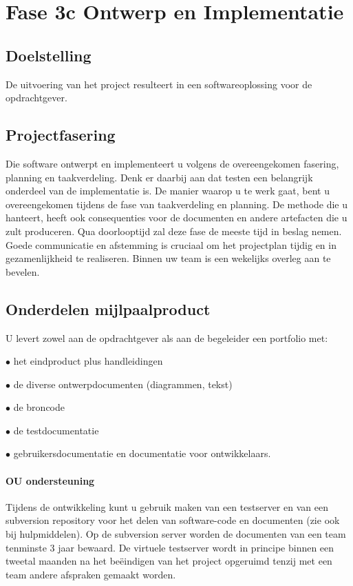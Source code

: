 \section{Fase 3c Ontwerp en Implementatie}
\subsection{Doelstelling}
De uitvoering van het project resulteert in een softwareoplossing
voor de opdrachtgever.

\subsection{Projectfasering}Die software ontwerpt en implementeert u volgens de
overeengekomen fasering, planning en taakverdeling. Denk er daarbij aan dat
testen een belangrijk onderdeel van de implementatie is. De manier waarop u
te werk gaat, bent u overeengekomen tijdens de fase van
taakverdeling en planning. De methode die u hanteert, heeft ook consequenties
voor de documenten en andere artefacten die u zult produceren. Qua doorlooptijd
zal deze fase de meeste tijd in beslag nemen. Goede
communicatie en afstemming is cruciaal om het projectplan tijdig en in
gezamenlijkheid te realiseren. Binnen uw team is een wekelijks overleg aan
te bevelen.
\subsection{Onderdelen mijlpaalproduct}
    U levert zowel aan de opdrachtgever als aan de begeleider een portfolio met:

    \par $\bullet$ het eindproduct plus handleidingen
    \par $\bullet$ de diverse ontwerpdocumenten (diagrammen, tekst)
    \par $\bullet$ de broncode
    \par $\bullet$ de testdocumentatie
    \par $\bullet$ gebruikersdocumentatie en documentatie voor ontwikkelaars.

\paragraph{OU ondersteuning} Tijdens de ontwikkeling kunt u gebruik maken van
een testserver en van een subversion repository voor het delen van software-code
en documenten (zie ook bij hulpmiddelen).  Op de subversion server worden de
documenten van een team tenminste 3 jaar bewaard. De virtuele testserver
wordt in principe binnen een tweetal maanden na het beëindigen van het project
opgeruimd tenzij met een team andere afspraken gemaakt worden.
